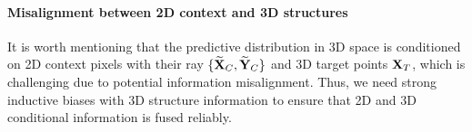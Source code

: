 \paragraph{Misalignment between 2D context and 3D structures} It is worth mentioning that the predictive distribution in 3D space is conditioned on 2D context pixels with their ray $\{{\bf{\widetilde{X}}}_{C}, {\bf{\widetilde{Y}}}_{C}\}$ and 3D target points ${\bf{X}}_{T}$, which is challenging due to potential information misalignment. Thus, we need strong inductive biases with 3D structure information to ensure that 2D and 3D conditional information is fused reliably.




